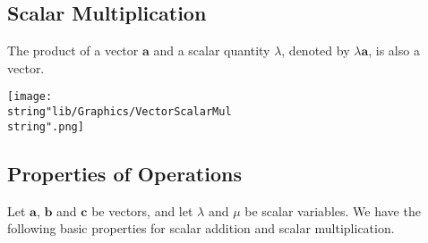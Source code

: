 \documentclass[11pt,a4paper]{book}
\begin{document}
\subsection{Scalar Multiplication}

The product of a vector $\textbf{a}$ and a scalar quantity $\lambda$,
denoted by $\lambda\textbf{a}$, is also a vector.
\begin{center}
\texttt{[image: \\string"lib/Graphics/VectorScalarMul\\string".png]}
\par\end{center}

\begin{center}
\par\end{center}

\subsection{Properties of Operations }

Let $\textbf{a}$, $\textbf{b}$ and $\textbf{c}$ be vectors, and
let $\lambda$ and $\mu$ be scalar variables. We have the following
basic properties for scalar addition and scalar multiplication.
\end{document}
